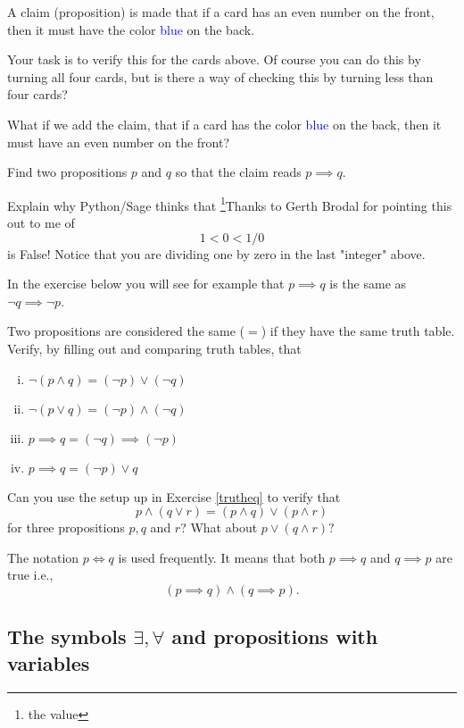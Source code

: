 \documentclass{article}
\begin{document}
A claim (proposition) is made that if a card has an even number on the front, then it
must have the color \textcolor{blue}{blue} on the back.

Your task is to verify this for the cards above. Of course you can
do this by turning all four cards, but is there a way of checking this
by turning less than four cards?

What if we add the claim, that if a card has the color 
\textcolor{blue}{blue} on the back, then
it must have an even number on the front?

\begin{hint}[showhide]
  Find two propositions $p$ and $q$ so that the claim reads
  $p\implies q$.
\end{hint}
  
\endshex


\beginshex
Explain why Python/Sage thinks that \footnote{the value}{Thanks to Gerth Brodal for pointing this out to me} of
  $$
  1 < 0 < 1/0
  $$
  is False! Notice that you are dividing one by zero in the last "integer" above.
\endshex


In the exercise below you will see for example that
$p\implies q$ is the same as $\neg q \implies \neg p$.

\beginshex\label{trutheq}
Two propositions are considered the same ($=$) if they have the same truth table. Verify, by
filling out and comparing truth tables, that
\begin{enumerate}[(i)]
\item
$\neg (p \land q) = (\neg p) \lor (\neg q)$
\item
$\neg (p \lor q) = (\neg p) \land (\neg q)$
\item
$p \implies q = (\neg q) \implies (\neg p)$
\item
$p \implies q = (\neg p)\lor q$
\end{enumerate}
\endshex

\beginshex\label{logictt}
Can you use the setup up in Exercise \ref{trutheq} to verify that
$$
p\land (q \lor r) = (p\land q) \lor (p \land r)
$$
for three propositions $p, q$ and $r$? What about
$
p\lor (q \land r)?
$
\endshex

The notation $p \iff q$ is used frequently. It means that both
$p\implies q$ and $q\implies p$ are true i.e.,
$$
(p\implies q) \land (q\implies p).
$$





\subsection{The symbols $\exists, \forall$ and propositions with variables}
\end{document}
